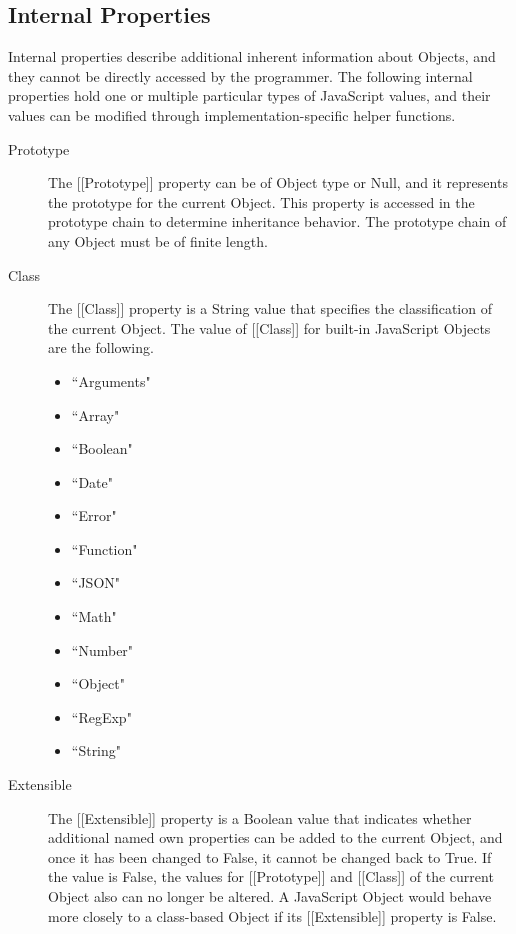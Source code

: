 \documentclass[a4paper,11pt,twoside]{report}
\begin{document}
\subsection{Internal Properties}
Internal properties describe additional inherent information about Objects, and they cannot be directly accessed by the programmer. The following internal properties hold one or multiple particular types of JavaScript values, and their values can be modified through implementation-specific helper functions.

\begin{description}
\item[Prototype] The [[Prototype]] property can be of Object type or Null, and it represents the prototype for the current Object. This property is accessed in the prototype chain to determine inheritance behavior. The prototype chain of any Object must be of finite length. 

\item[Class] The [[Class]] property is a String value that specifies the classification of the current Object. The value of [[Class]] for built-in JavaScript Objects are the following.
\begin{multicols}{3}
\begin{itemize}
	\item ``Arguments"
	\item ``Array"
	\item ``Boolean"
	\item ``Date"
	\item ``Error"
	\item ``Function"
	\item ``JSON"
	\item ``Math"
	\item ``Number"
	\item ``Object"
	\item ``RegExp"
	\item ``String"
\end{itemize}
\end{multicols}

\item[Extensible] The [[Extensible]] property is a Boolean value that indicates whether additional named own properties can be added to the current Object, and once it has been changed to False, it cannot be changed back to True. If the value is False, the values for [[Prototype]] and [[Class]] of the current Object also can no longer be altered. A JavaScript Object would behave more closely to a class-based Object if its [[Extensible]] property is False.
\end{description}
\end{document}
